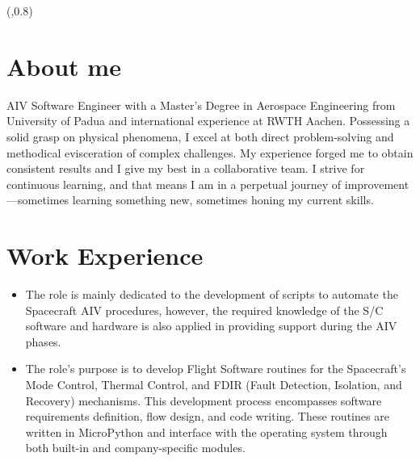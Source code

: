 \documentclass[a4paper, 12pt]{my_cv}
\newlength\MyColWidth
\newlength\MyTopMargin
\newlength\MainWidth
\begin{document}
\TPMargin{5mm}
\begin{textblock*}{\MainWidth}(\MyColWidth,0.8\MyTopMargin){
    
    
    
    }
        
    \section*{About me}
      AIV Software Engineer with a Master's Degree in Aerospace Engineering from University of Padua and international experience at RWTH Aachen. Possessing a solid grasp on physical phenomena, I excel at both direct problem-solving and methodical evisceration of complex challenges. My experience forged me to obtain consistent results and I give my best in a collaborative team. I strive for continuous learning, and that means I am in a perpetual journey of improvement—sometimes learning something new, sometimes honing my current skills.

    \section*{Work Experience}
    \begin{itemize}
        \item {}
    
    The role is mainly dedicated to the development of scripts to automate the Spacecraft AIV procedures, however, the required knowledge of the S/C software and hardware is also applied in providing support during the AIV phases.
    
        \item {}
    
    The role's purpose is to develop Flight Software routines for the Spacecraft's Mode Control, Thermal Control, and FDIR (Fault Detection, Isolation, and Recovery) mechanisms. This development process encompasses software requirements definition, flow design, and code writing. These routines are written in MicroPython and interface with the operating system through both built-in and company-specific modules.
    \end{itemize}
    

\end{textblock*}
\end{document}
